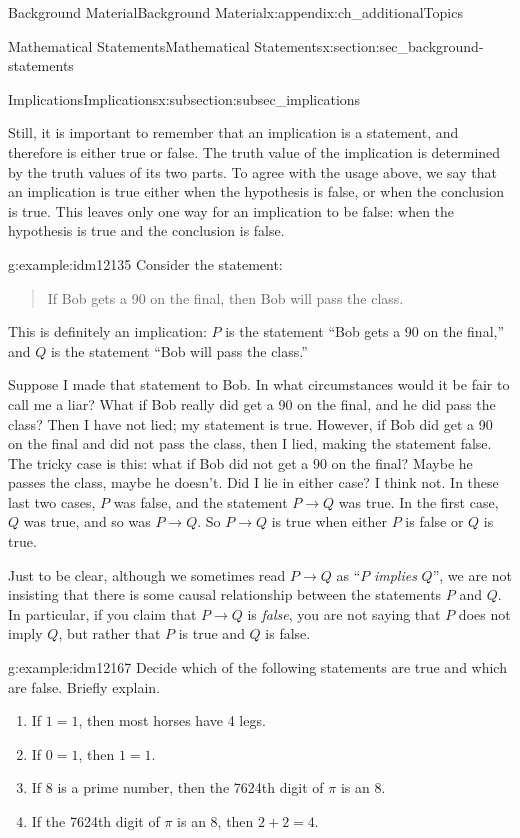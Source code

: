 \documentclass[oneside,10pt,]{book}
\numberwithin{equation}{chapter}
\def\imp{\rightarrow}
\begin{document}
\begin{appendixptx}{Background Material}{}{Background Material}{}{}{x:appendix:ch_additionalTopics}
\begin{sectionptx}{Mathematical Statements}{}{Mathematical Statements}{}{}{x:section:sec_background-statements}
\begin{subsectionptx}{Implications}{}{Implications}{}{}{x:subsection:subsec_implications}
\par
Still, it is important to remember that an implication is a statement, and therefore is either true or false. The truth value of the implication is determined by the truth values of its two parts. To agree with the usage above, we say that an implication is true either when the hypothesis is false, or when the conclusion is true. This leaves only one way for an implication to be false: when the hypothesis is true and the conclusion is false.%
\begin{example}{}{g:example:idm12135}%
Consider the statement:%
\begin{quote}%
If Bob gets a 90 on the final, then Bob will pass the class.%
\end{quote}
This is definitely an implication: \(P\) is the statement ``Bob gets a 90 on the final,'' and \(Q\) is the statement ``Bob will pass the class.''%
\par
Suppose I made that statement to Bob. In what circumstances would it be fair to call me a liar? What if Bob really did get a 90 on the final, and he did pass the class? Then I have not lied; my statement is true. However, if Bob did get a 90 on the final and did not pass the class, then I lied, making the statement false. The tricky case is this: what if Bob did not get a 90 on the final? Maybe he passes the class, maybe he doesn't. Did I lie in either case? I think not. In these last two cases, \(P\) was false, and the statement \(P \imp Q\) was true. In the first case, \(Q\) was true, and so was \(P \imp Q\). So \(P \imp Q\) is true when either \(P\) is false or \(Q\) is true.%
\end{example}
Just to be clear, although we sometimes read \(P \imp Q\) as ``\(P\) \emph{implies} \(Q\)'', we are not insisting that there is some causal relationship between the statements \(P\) and \(Q\). In particular, if you claim that \(P \imp Q\) is \emph{false}, you are not saying that \(P\) does not imply \(Q\), but rather that \(P\) is true and \(Q\) is false.%
\begin{example}{}{g:example:idm12167}%
Decide which of the following statements are true and which are false. Briefly explain.%
\begin{enumerate}
\item{}If \(1=1\), then most horses have 4 legs.%
\item{}If \(0=1\), then \(1=1\).%
\item{}If 8 is a prime number, then the 7624th digit of \(\pi\) is an 8.%
\item{}If the 7624th digit of \(\pi\) is an 8, then \(2+2 = 4\).%

\end{enumerate}
\end{example}
\end{subsectionptx}
\end{sectionptx}
\end{appendixptx}
\end{document}

